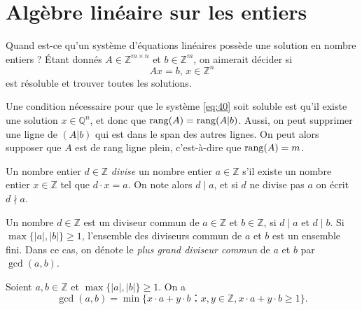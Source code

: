 \chapter{Algèbre linéaire sur les entiers}
\label{cha:algebre-lineaire-sur}
 

Quand est-ce qu'un système d'équations linéaires possède une solution en nombre entiers ? Étant donnés $A ∈ℤ^{m × n}$ et $b ∈ℤ^m$, on aimerait décider si 
\begin{equation}
  \label{eq:40}
  A x = b, \, x ∈ ℤ^n 
\end{equation}
est résoluble et trouver toutes les solutions.



Une condition nécessaire pour que le système \eqref{eq:40} soit soluble est qu'il existe une solution $x ∈ℚ^n$, et donc que $\operatorname{rang}(A) = \operatorname{rang}(A|b)$. Aussi, on peut supprimer une ligne de $(A|b)$ qui est dans le span des autres lignes. On peut alors supposer que $A$ est de rang ligne plein, c'est-à-dire que $\operatorname{rang}(A) = m$. 

\begin{definition}
\label{def:59}
  Un nombre entier $d ∈ℤ$ \emph{divise} un nombre entier $a ∈ℤ$ s'il existe un nombre entier $x ∈ℤ$ tel que $d⋅x =a$. On note alors $d\mid a$, et si $d$ ne divise pas $a$ on écrit $d \nmid a$. 
\end{definition}
\begin{definition}
  \label{def:45}
  Un nombre $d ∈ℤ$ est un diviseur commun de $a∈ℤ$ et $b ∈ℤ$, si $d \mid a$ et $d \mid b$. Si $\max\{|a|,|b|\} ≥1$, l'ensemble des diviseurs commun de $a$ et $b$ est un ensemble fini. Dans ce cas, on dénote le \emph{plus grand diviseur commun} de $a$ et $b$ par $\gcd(a,b)$. 
\end{definition}


\begin{theorem}
  \label{thr:48}
  Soient $a,b ∈ℤ$ et $\max\{|a|,|b|\} ≥1$. On a
  \begin{displaymath}
    \gcd(a,b) = \min \{ x ⋅a + y ⋅ b： x,y ∈ℤ,  x ⋅a + y ⋅ b≥1\}.
  \end{displaymath}
\end{theorem}

